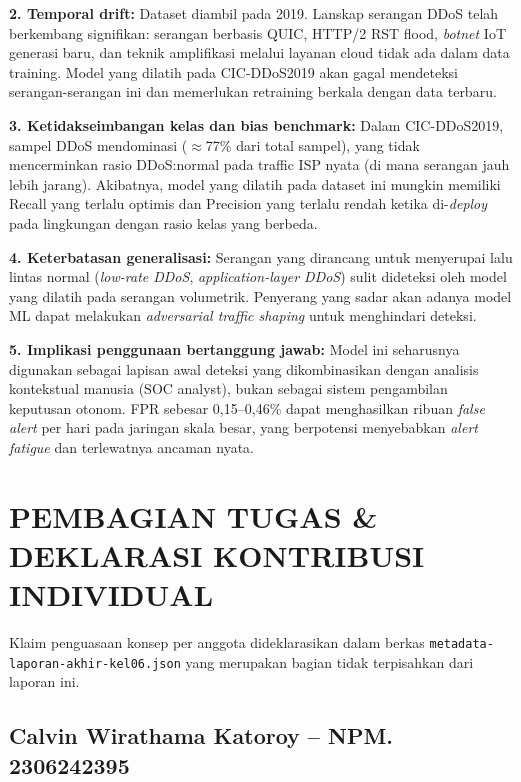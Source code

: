 \documentclass[11pt,a4paper,oneside]{report}
\begin{document}
\textbf{2. Temporal drift:} Dataset diambil pada 2019. Lanskap serangan DDoS telah berkembang signifikan: serangan berbasis QUIC, HTTP/2 RST flood, \textit{botnet} IoT generasi baru, dan teknik amplifikasi melalui layanan cloud tidak ada dalam data training. Model yang dilatih pada CIC-DDoS2019 akan gagal mendeteksi serangan-serangan ini dan memerlukan retraining berkala dengan data terbaru.

\textbf{3. Ketidakseimbangan kelas dan bias benchmark:} Dalam CIC-DDoS2019, sampel DDoS mendominasi ($\approx$77\% dari total sampel), yang tidak mencerminkan rasio DDoS:normal pada traffic ISP nyata (di mana serangan jauh lebih jarang). Akibatnya, model yang dilatih pada dataset ini mungkin memiliki Recall yang terlalu optimis dan Precision yang terlalu rendah ketika di-\textit{deploy} pada lingkungan dengan rasio kelas yang berbeda.

\textbf{4. Keterbatasan generalisasi:} Serangan yang dirancang untuk menyerupai lalu lintas normal (\textit{low-rate DDoS}, \textit{application-layer DDoS}) sulit dideteksi oleh model yang dilatih pada serangan volumetrik. Penyerang yang sadar akan adanya model ML dapat melakukan \textit{adversarial traffic shaping} untuk menghindari deteksi.

\textbf{5. Implikasi penggunaan bertanggung jawab:} Model ini seharusnya digunakan sebagai lapisan awal deteksi yang dikombinasikan dengan analisis kontekstual manusia (SOC analyst), bukan sebagai sistem pengambilan keputusan otonom. FPR sebesar 0,15--0,46\% dapat menghasilkan ribuan \textit{false alert} per hari pada jaringan skala besar, yang berpotensi menyebabkan \textit{alert fatigue} dan terlewatnya ancaman nyata.

\chapter{PEMBAGIAN TUGAS \& DEKLARASI KONTRIBUSI INDIVIDUAL}
\label{bab:kontribusi}

Klaim penguasaan konsep per anggota dideklarasikan dalam berkas \texttt{metadata-laporan-akhir-kel06.json} yang merupakan bagian tidak terpisahkan dari laporan ini.

\section{Calvin Wirathama Katoroy -- NPM. 2306242395}
\end{document}

